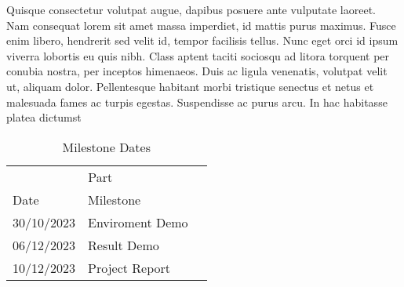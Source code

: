\documentclass[../proposal.tex]{subfiles}
\begin{document}
Quisque consectetur volutpat augue, dapibus posuere ante vulputate laoreet. Nam consequat lorem sit amet massa imperdiet, id mattis purus maximus. Fusce enim libero, hendrerit sed velit id, tempor facilisis tellus. Nunc eget orci id ipsum viverra lobortis eu quis nibh. Class aptent taciti sociosqu ad litora torquent per conubia nostra, per inceptos himenaeos. Duis ac ligula venenatis, volutpat velit ut, aliquam dolor. Pellentesque habitant morbi tristique senectus et netus et malesuada fames ac turpis egestas. Suspendisse ac purus arcu. In hac habitasse platea dictumst
\label{milestones}

\begin{table}
    \caption{Milestone Dates}
    \label{dates-table}
    \centering
    \begin{tabular}{lll}
        \toprule
        \multicolumn{2}{c}{Part}                   \\
        \cmidrule(r){1-2}
        Date     & Milestone                       \\
        \midrule
        30/10/2023 & Enviroment Demo               \\
        06/12/2023 & Result Demo                   \\
        10/12/2023 & Project Report                \\
        \bottomrule
    \end{tabular}
\end{table}
  
\end{document}
